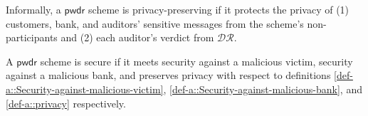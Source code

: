 \vspace{-2mm}

Informally, a $\mathsf{pwdr}$ scheme is privacy-preserving if it protects the privacy of (1)  customers, bank, and auditors' sensitive messages from the scheme's non-participants and (2) each auditor's verdict from $\mathcal{DR}$.%







\vspace{-3.2mm}
\begin{definition}[Security]\label{def-a::PwDR-security}
A $\mathsf{pwdr}$ scheme is secure if it meets security against a malicious victim,  security against a malicious bank, and preserves privacy with respect to definitions \ref{def-a::Security-against-malicious-victim}, \ref{def-a::Security-against-malicious-bank}, and \ref{def-a::privacy} respectively. 
\end{definition}




